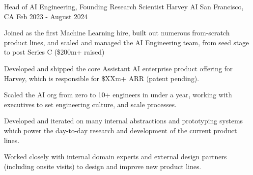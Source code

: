
\begin{cventries}

  \cventry
  {Head of AI Engineering, Founding Research Scientist}
  {Harvey AI}
  {San Francisco, CA}
  {Feb 2023 - August 2024}
  {
    \begin{cvitems}
      \item Joined as the first Machine Learning hire, built out numerous from-scratch product lines,
      and scaled and managed the AI Engineering team, from seed stage to post Series C (\$200m+ raised)
      \item Developed and shipped the core Assistant AI enterprise product offering for Harvey, which is
      responsible for \$XXm+ ARR (patent pending).
      \item Scaled the AI org from zero to 10+ engineers in under a year, working with executives to
      set engineering culture, and scale processes.
      \item Developed and iterated on many internal abstractions and prototyping systems which power the day-to-day research
      and development of the current product lines.
      \item Worked closely with internal domain experts and external design partners (including onsite visits) to design and
      improve new product lines.
    \end{cvitems}
  }


\end{cventries}
